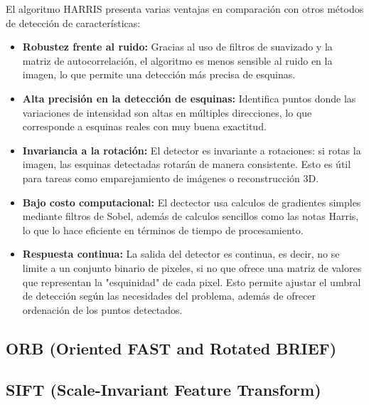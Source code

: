 \documentclass[a4paper]{article}
\begin{document}
  El algoritmo HARRIS presenta varias ventajas en comparación con otros métodos de detección de características:
  
  \begin{itemize}
      \item \textbf{Robustez frente al ruido:}  
      Gracias al uso de filtros de suavizado y la matriz de autocorrelación, el algoritmo es menos sensible al ruido en la imagen, lo que permite una detección más precisa de esquinas.
      
      \item \textbf{Alta precisión en la detección de esquinas:}  
      Identifica puntos donde las variaciones de intensidad son altas en múltiples direcciones, lo que corresponde a esquinas reales con muy buena exactitud.
      
      \item \textbf{Invariancia a la rotación:}  
      El detector es invariante a rotaciones: si rotas la imagen, las esquinas detectadas rotarán de manera consistente. Esto es útil para tareas como emparejamiento de imágenes o reconstrucción 3D.
      
      \item \textbf{Bajo costo computacional:}  
      El dectector usa calculos de gradientes simples mediante filtros de Sobel, además de calculos sencillos como las notas Harris, lo que lo hace eficiente en términos de tiempo de procesamiento.
      
      \item \textbf{Respuesta continua:}
      La salida del detector es continua, es decir, no se limite a un conjunto binario de pixeles, si no que ofrece una matriz
      de valores que representan la "esquinidad" de cada pixel. Esto permite ajustar el umbral de detección según las necesidades del problema, además de ofrecer ordenación de los puntos detectados.  
    \end{itemize}
  
  \par\vspace{0.5cm}


  \subsection{ORB (Oriented FAST and Rotated BRIEF)}
  \par\vspace{0.5cm}

  \subsection{SIFT (Scale-Invariant Feature Transform)}
  \par\vspace{0.5cm}
  
\end{document}
